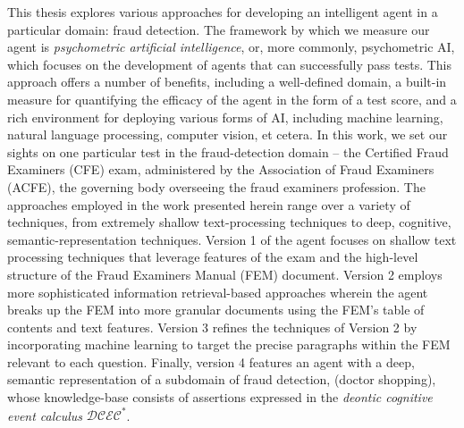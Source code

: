  
 
This thesis explores various approaches for developing an intelligent agent in a particular domain: fraud detection.  The framework by which we measure our agent is \textit{psychometric artificial intelligence}, or, more commonly, psychometric AI, which focuses on the development of agents that can successfully pass tests.  This approach offers a number of
benefits, including a well-defined domain, a built-in measure for quantifying the efficacy
of the agent in the form of a test score, and a rich environment for deploying various
forms of AI, including machine learning, natural language processing, computer vision,
et cetera.  In this work, we set our sights on one particular test in the fraud-detection domain -- the Certified Fraud Examiners (CFE) exam, administered by the Association of Fraud Examiners 
(ACFE), the governing body overseeing the fraud examiners profession.  The approaches employed in the work presented herein range over a variety of techniques, from extremely shallow text-processing techniques to deep, cognitive, semantic-representation techniques. Version 1 of the agent focuses on shallow text processing techniques that leverage features of the exam and the high-level structure of the Fraud Examiners Manual (FEM) document.  Version 2 employs more sophisticated information retrieval-based approaches wherein the agent breaks up the FEM into more granular documents using the FEM's table of contents and text features.  Version 3 refines the techniques of Version 2 by incorporating machine learning to target the precise paragraphs within the FEM relevant to each question.  Finally, version 4 features an agent with a deep, semantic representation of a subdomain of fraud detection, (doctor shopping), whose knowledge-base consists of assertions expressed in the \textit{deontic cognitive event calculus} $\mathcal{DCEC}^\ast$.  